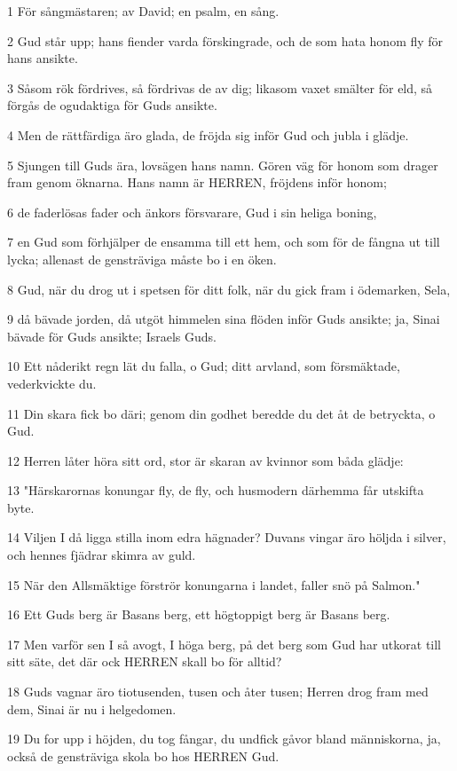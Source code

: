 \par 1 För sångmästaren; av David; en psalm, en sång.
\par 2 Gud står upp; hans fiender varda förskingrade, och de som hata honom fly för hans ansikte.
\par 3 Såsom rök fördrives, så fördrivas de av dig; likasom vaxet smälter för eld, så förgås de ogudaktiga för Guds ansikte.
\par 4 Men de rättfärdiga äro glada, de fröjda sig inför Gud och jubla i glädje.
\par 5 Sjungen till Guds ära, lovsägen hans namn. Gören väg för honom som drager fram genom öknarna. Hans namn är HERREN, fröjdens inför honom;
\par 6 de faderlösas fader och änkors försvarare, Gud i sin heliga boning,
\par 7 en Gud som förhjälper de ensamma till ett hem, och som för de fångna ut till lycka; allenast de gensträviga måste bo i en öken.
\par 8 Gud, när du drog ut i spetsen för ditt folk, när du gick fram i ödemarken, Sela,
\par 9 då bävade jorden, då utgöt himmelen sina flöden inför Guds ansikte; ja, Sinai bävade för Guds ansikte; Israels Guds.
\par 10 Ett nåderikt regn lät du falla, o Gud; ditt arvland, som försmäktade, vederkvickte du.
\par 11 Din skara fick bo däri; genom din godhet beredde du det åt de betryckta, o Gud.
\par 12 Herren låter höra sitt ord, stor är skaran av kvinnor som båda glädje:
\par 13 "Härskarornas konungar fly, de fly, och husmodern därhemma får utskifta byte.
\par 14 Viljen I då ligga stilla inom edra hägnader? Duvans vingar äro höljda i silver, och hennes fjädrar skimra av guld.
\par 15 När den Allsmäktige förströr konungarna i landet, faller snö på Salmon."
\par 16 Ett Guds berg är Basans berg, ett högtoppigt berg är Basans berg.
\par 17 Men varför sen I så avogt, I höga berg, på det berg som Gud har utkorat till sitt säte, det där ock HERREN skall bo för alltid?
\par 18 Guds vagnar äro tiotusenden, tusen och åter tusen; Herren drog fram med dem, Sinai är nu i helgedomen.
\par 19 Du for upp i höjden, du tog fångar, du undfick gåvor bland människorna, ja, också de gensträviga skola bo hos HERREN Gud.
